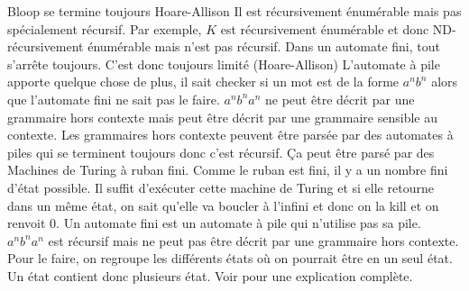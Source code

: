 \begin{mcqs}
  {Bloop se termine toujours}
  {Hoare-Allison}
  {Il est récursivement énumérable mais pas spécialement récursif.
  Par exemple, $K$ est récursivement énumérable et donc ND-récursivement énumérable mais n'est pas récursif.}
  {Dans un automate fini, tout s'arrête toujours. C'est donc toujours limité (Hoare-Allison)}
  {L'automate à pile apporte quelque chose de plus, il sait checker si un mot est de la forme $a^nb^n$ alors que l'automate fini ne sait pas le faire.}
  {$a^nb^na^n$ ne peut être décrit par une grammaire hors contexte mais peut être décrit par une grammaire sensible au contexte.}
  {Les grammaires hors contexte peuvent être parsée par des automates à piles qui se terminent toujours donc c'est récursif.}
  {Ça peut être parsé par des Machines de Turing à ruban fini.
  Comme le ruban est fini, il y a un nombre fini d'état possible.
  Il suffit d'exécuter cette machine de Turing et si elle retourne dans un même état, on sait qu'elle va boucler à l'infini
  et donc on la kill et on renvoit 0.}
  {Un automate fini est un automate à pile qui n'utilise pas sa pile.}
  {$a^nb^na^n$ est récursif mais ne peut pas être décrit par une grammaire hors contexte.}
  {Pour le faire, on regroupe les différents états où on pourrait être en un seul état.
  Un état contient donc plusieurs état.
  Voir \cite[Section~2.7]{campbell2012introduction} pour une explication complète.}
\end{mcqs}
